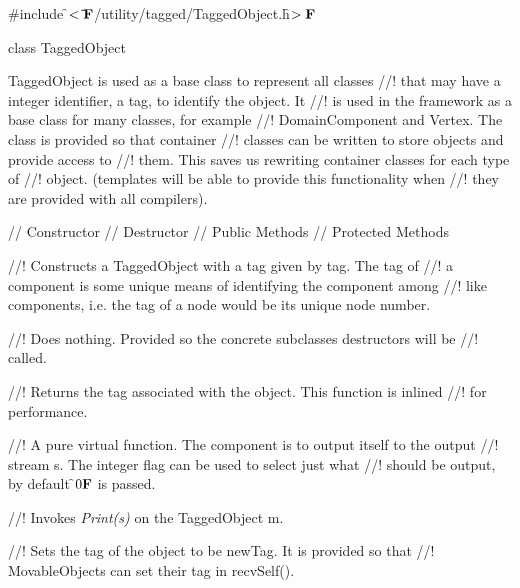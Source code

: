 
\indent \#include \f$<\tilde{ }{\bf F}$/utility/tagged/TaggedObject.h\f$>{\bf F}$

\indent class TaggedObject

\indent{}
\indent{}

\indent TaggedObject is used as a base class to represent all classes
//! that may have a integer identifier, a tag, to identify the object. It
//! is used in the framework as a base class for many classes, for example
//! DomainComponent and Vertex. The class is provided so that container
//! classes can be written to store objects and provide access to
//! them. This saves us rewriting container classes for each type of 
//! object. (templates will be able to provide this functionality when
//! they are provided with all compilers). 

\indent // Constructor
\indent // Destructor
\indent // Public Methods
\indent // Protected Methods

//! Constructs a TaggedObject with a tag given by \p tag. The tag of
//! a component is some unique means of identifying the component among
//! like components, i.e. the tag of a node would be its unique node number.

//! Does nothing. Provided so the concrete subclasses destructors will be
//! called.

//! Returns the tag associated with the object. This function is inlined
//! for performance.

//! A pure virtual function. The component is to output itself to the output
//! stream \p s. The integer \p flag can be used to select just what
//! should be output, by default \f$0{\bf F}$ is passed.

//! Invokes {\em Print(s)} on the TaggedObject \p m.

//! Sets the tag of the object to be \p newTag. It is provided so that
//! MovableObjects can set their tag in recvSelf().







